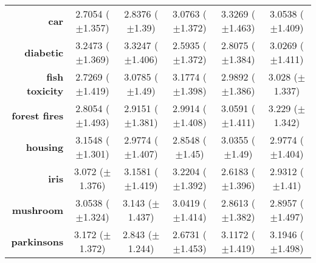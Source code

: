 \begin{table}[htb]
{\begin{tabular}{r|ccccc}
			\textbf{car}                 & \cellcolor[rgb]{ .388,  .745,  .482}2.7054 ($\pm$1.357) & \cellcolor[rgb]{ .62,  .812,  .494}2.8376 ($\pm$1.39)   & \cellcolor[rgb]{ 1,  .882,  .51}3.0763 ($\pm$1.372)     & \cellcolor[rgb]{ .973,  .412,  .42}3.3269 ($\pm$1.463)  & \cellcolor[rgb]{ 1,  .922,  .518}3.0538 ($\pm$1.409)    \\
			\textbf{diabetic}            & \cellcolor[rgb]{ .98,  .545,  .447}3.2473 ($\pm$1.369)  & \cellcolor[rgb]{ .973,  .412,  .42}3.3247 ($\pm$1.406)  & \cellcolor[rgb]{ .388,  .745,  .482}2.5935 ($\pm$1.372) & \cellcolor[rgb]{ .69,  .831,  .498}2.8075 ($\pm$1.384)  & \cellcolor[rgb]{ 1,  .922,  .518}3.0269 ($\pm$1.411)    \\
			\textbf{fish toxicity}       & \cellcolor[rgb]{ .388,  .745,  .482}2.7269 ($\pm$1.419) & \cellcolor[rgb]{ .992,  .753,  .486}3.0785 ($\pm$1.49)  & \cellcolor[rgb]{ .973,  .412,  .42}3.1774 ($\pm$1.398)  & \cellcolor[rgb]{ .918,  .898,  .51}2.9892 ($\pm$1.386)  & \cellcolor[rgb]{ 1,  .922,  .518}3.028 ($\pm$1.337)     \\
			\textbf{forest fires}        & \cellcolor[rgb]{ .388,  .745,  .482}2.8054 ($\pm$1.493) & \cellcolor[rgb]{ .745,  .847,  .502}2.9151 ($\pm$1.381) & \cellcolor[rgb]{ 1,  .922,  .518}2.9914 ($\pm$1.408)    & \cellcolor[rgb]{ .996,  .776,  .49}3.0591 ($\pm$1.411)  & \cellcolor[rgb]{ .973,  .412,  .42}3.229 ($\pm$1.342)   \\
			\textbf{housing}             & \cellcolor[rgb]{ .973,  .412,  .42}3.1548 ($\pm$1.301)  & \cellcolor[rgb]{ 1,  .922,  .518}2.9774 ($\pm$1.407)    & \cellcolor[rgb]{ .388,  .745,  .482}2.8548 ($\pm$1.45)  & \cellcolor[rgb]{ .992,  .757,  .486}3.0355 ($\pm$1.49)  & \cellcolor[rgb]{ 1,  .922,  .518}2.9774 ($\pm$1.404)    \\
			\textbf{iris}                & \cellcolor[rgb]{ 1,  .922,  .518}3.072 ($\pm$1.376)     & \cellcolor[rgb]{ .984,  .627,  .463}3.1581 ($\pm$1.419) & \cellcolor[rgb]{ .973,  .412,  .42}3.2204 ($\pm$1.392)  & \cellcolor[rgb]{ .388,  .745,  .482}2.6183 ($\pm$1.396) & \cellcolor[rgb]{ .808,  .867,  .506}2.9312 ($\pm$1.41)  \\
			\textbf{mushroom}            & \cellcolor[rgb]{ 1,  .863,  .51}3.0538 ($\pm$1.324)     & \cellcolor[rgb]{ .973,  .412,  .42}3.143 ($\pm$1.437)   & \cellcolor[rgb]{ 1,  .922,  .518}3.0419 ($\pm$1.414)    & \cellcolor[rgb]{ .388,  .745,  .482}2.8613 ($\pm$1.382) & \cellcolor[rgb]{ .502,  .776,  .486}2.8957 ($\pm$1.497) \\
			\textbf{parkinsons}          & \cellcolor[rgb]{ .984,  .561,  .451}3.172 ($\pm$1.372)  & \cellcolor[rgb]{ .62,  .812,  .494}2.843 ($\pm$1.244)   & \cellcolor[rgb]{ .388,  .745,  .482}2.6731 ($\pm$1.453) & \cellcolor[rgb]{ 1,  .922,  .518}3.1172 ($\pm$1.419)    & \cellcolor[rgb]{ .973,  .412,  .42}3.1946 ($\pm$1.498)  \\

\end{tabular}}
\end{table}
